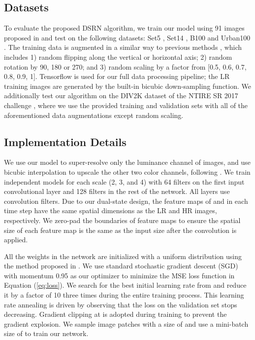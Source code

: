 \documentclass[10pt,twocolumn,letterpaper]{article}
\newcommand{\algname}{DSRN }
\begin{document}
\subsection{Datasets}  To evaluate the proposed \algname algorithm, we train our model using 91 images proposed in \cite{yang2010image} and test on the following datasets: Set5 \cite{bevilacqua2012low}, Set14 \cite{zeyde2010single}, B100 \cite{martin2001database} and Urban100 \cite{huang2015single}. The training data is augmented in a similar way to previous methods \cite{kim2016accurate,tai2017image}, which includes 1) random flipping along the vertical or horizontal axis;  2) random rotation by 90\textdegree{}, 180\textdegree{} or 270\textdegree{}; and  3) random scaling by a factor from [0.5, 0.6, 0.7, 0.8, 0.9, 1]. Tensorflow is used for our full data processing pipeline; the LR training images are generated by the built-in bicubic down-sampling function.  We additionally test our algorithm on 
the DIV2K dataset of the NTIRE SR 2017 challenge \cite{agustsson2017ntire}, where we use the provided training and validation sets with all of the aforementioned data augmentations except random scaling. 

\subsection{Implementation Details}
We use our model to super-resolve only the luminance channel of images, and use bicubic interpolation to upscale the other two color channels, following \cite{kim2016accurate,kim2016deeply,tai2017image}. 
We train independent models for each scale (2, 3, and 4) with 64 filters on the first input convolutional layer and 128 filters in the rest of the network.  All layers use  convolution filters.  
Due to our dual-state design, the feature maps of  and  in each time step  have the same spatial dimensions as the LR and HR images, respectively.
We zero-pad the boundaries of feature maps to ensure the spatial size of each feature map is the same as the input size after the convolution is applied.  



All the weights in the network are initialized with a uniform distribution using the method proposed in \cite{glorot2010understanding}. We use standard stochastic gradient descent (SGD) with momentum 0.95 as our optimizer to minimize the MSE loss function in Equation (\ref{eq:loss}). We search for the best initial learning rate from  and reduce it by a factor of 10 three times during the entire training process.  This learning rate annealing is driven by observing that the loss on the validation set stops decreasing.  Gradient clipping at  is adopted during training to prevent the gradient explosion.  We sample image patches with a size of  and use a mini-batch size of  to train our network.
\end{document}
